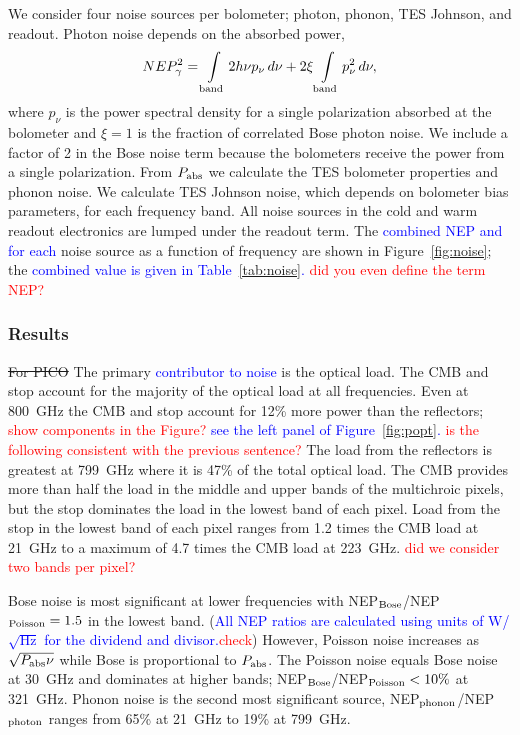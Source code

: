 \documentclass[]{spie}  %
\newcommand{\comr}[1]{\textcolor{red}{#1}}
\newcommand{\comb}[1]{\textcolor{blue}{#1}}
\begin{document}
We consider four noise sources per bolometer; photon, phonon, TES Johnson, and readout. 
Photon noise depends on the absorbed power\cite{richards1994}, 
\begin{equation}
\label{eq:photon}
NEP_{\gamma}^2 = \int\limits_{\rm band} 2h\nu p_{\nu} \, d\nu + 2\xi \int\limits_{\rm band} p_{\nu}^2 \,  d\nu,
\end{equation} 
where $p_{\nu}$ is the power spectral density for a single polarization absorbed at the bolometer and $\xi=1$ is the fraction of correlated Bose 
photon noise. We include a factor of 2 in the Bose noise term because the bolometers receive the power from a single 
polarization. 
From $P_{\rm abs}$ we calculate the TES bolometer properties and phonon noise.\cite{mather1982}  
We calculate TES Johnson noise, which depends on bolometer bias parameters, for each frequency band.  
All noise sources in the cold and warm readout electronics are lumped under the readout term.  The \comb{combined NEP and for each} noise source as a function 
of frequency are shown in Figure~\ref{fig:noise}; the \comb{combined value is given in Table~\ref{tab:noise}.} \comr{did you even define the term NEP?}

\subsubsection{Results}  %

\sout{For PICO} The primary \comb{contributor to noise}  is the optical load.  The CMB and stop account for the majority of the optical load 
at all frequencies. Even at 800~GHz the CMB and stop
account for 12\% more power than the reflectors;  \comr{show components in the Figure?} \comb{see the left panel 
of Figure~\ref{fig:popt}.}
\comr{is the following consistent with the previous sentence?} The load from the reflectors is greatest at 799~GHz where it is 47\% of the total 
optical load. The CMB provides more than half the load 
in the middle and upper bands of the multichroic pixels, but the stop dominates the load in the lowest band of each pixel.  
Load from the stop in the lowest band of each pixel ranges from 1.2 times the CMB load at 21~GHz to a maximum of 4.7 
times the CMB load at 223~GHz. \comr{did we consider two bands per pixel? }

Bose noise is most significant 
at lower frequencies with NEP$_{\rm Bose}$/NEP$_{\rm Poisson}= 1.5 $ in the lowest band. (\comb{All NEP ratios are calculated using 
units of W/$\sqrt{\mbox{Hz}}$ for the dividend and divisor.}\comr{check})   However, Poisson noise increases as 
$\sqrt{P_{\rm abs}\nu}$ while Bose is proportional to $P_{\rm abs}$. The Poisson noise equals Bose noise at 30~GHz and dominates at higher bands; 
NEP$_{\rm Bose}$/NEP$_{\rm Poisson} <10\%$ at 321~GHz. 
Phonon noise is the second most significant source, NEP$_{\rm phonon}$/NEP$_{\rm photon}$ ranges from 65\% at 21~GHz 
to 19\% at 799~GHz. 
\end{document}
